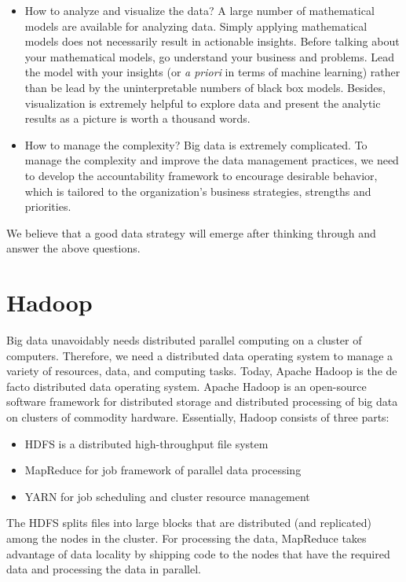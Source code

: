 \documentclass[12pt]{book}
\begin{document}
\begin{itemize}
\item How to analyze and visualize the data? A large number of mathematical models are available for analyzing data. Simply applying mathematical models does not necessarily result in actionable insights. Before talking about your mathematical models, go understand your business and problems. Lead the model with your insights (or {\em a priori} in terms of machine learning) rather than be lead by the uninterpretable numbers of black box models. Besides, visualization is extremely helpful to explore data and present the analytic results as a picture is worth a thousand words.
\item How to manage the complexity? Big data is extremely complicated. To manage the complexity and improve the data management practices, we need to develop the accountability framework to encourage desirable behavior, which is tailored to the organization's business strategies, strengths and priorities.
\end{itemize}

We believe that a good data strategy will emerge after thinking through and answer the above questions.

\chapter[Hadoop]
{Hadoop}
Big data unavoidably needs distributed parallel computing on a cluster of computers. Therefore, we need a distributed data operating system to manage a variety of resources, data, and computing tasks. Today, Apache Hadoop \cite{Hadoop} is the de facto distributed data operating system. Apache Hadoop is an open-source software framework for distributed storage and distributed processing of big data on clusters of commodity hardware. Essentially, Hadoop consists of three parts:
\begin{itemize}
\item HDFS is a distributed high-throughput file system
\item MapReduce for job framework of parallel data processing
\item YARN for job scheduling and cluster resource management
\end{itemize}
The HDFS splits files into large blocks that are distributed (and replicated) among the nodes in the cluster. For processing the data, MapReduce takes advantage of data locality by shipping code to the nodes that have the required data and processing the data in parallel.
\end{document}
